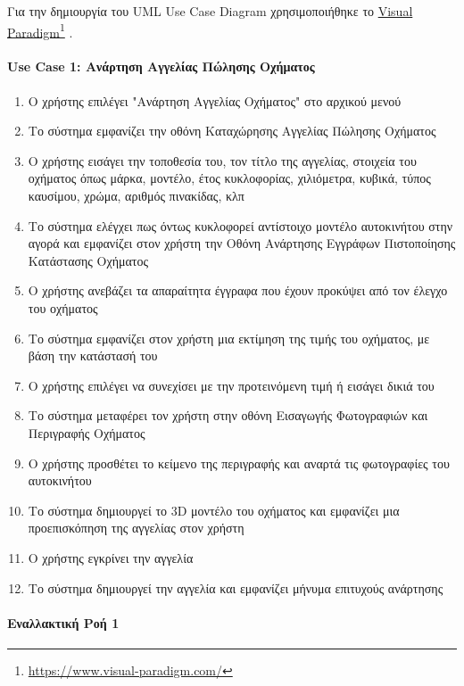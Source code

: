 \documentclass{../ol-softwaremanual}
\newcommand{\doclink}[2]{\href{#1}{#2}\footnote{\url{#1}}}
\begin{document}
	Για την δημιουργία του \en UML Use Case Diagram \gr χρησιμοποιήθηκε το \en \doclink{https://www.visual-paradigm.com/}{Visual Paradigm} . \gr \break 
	
	\newpage
	
	
	\paragraph{\en Use Case 1: \gr Ανάρτηση Αγγελίας Πώλησης Οχήματος}
	
	\begin{enumerate}
		
		\item Ο χρήστης επιλέγει \en"\gr Ανάρτηση Αγγελίας Οχήματος\en" \gr στο αρχικού μενού
		\item Το σύστημα εμφανίζει την οθόνη Καταχώρησης Αγγελίας Πώλησης Οχήματος
		\item Ο χρήστης εισάγει την τοποθεσία του, τον τίτλο της αγγελίας, στοιχεία του οχήματος όπως μάρκα, μοντέλο, έτος κυκλοφορίας, χιλιόμετρα, κυβικά, τύπος καυσίμου, χρώμα, αριθμός πινακίδας, κλπ
		\item Το σύστημα ελέγχει πως όντως κυκλοφορεί αντίστοιχο μοντέλο αυτοκινήτου στην αγορά και εμφανίζει στον χρήστη την Οθόνη Ανάρτησης Εγγράφων Πιστοποίησης Κατάστασης Οχήματος
		\item Ο χρήστης ανεβάζει τα απαραίτητα έγγραφα που έχουν προκύψει από τον έλεγχο του οχήματος		
		\item Το σύστημα εμφανίζει στον χρήστη μια εκτίμηση της τιμής του οχήματος, με βάση την κατάστασή του
		\item Ο χρήστης επιλέγει να συνεχίσει με την προτεινόμενη τιμή ή εισάγει δικιά του
		\item Το σύστημα μεταφέρει τον χρήστη στην οθόνη Εισαγωγής Φωτογραφιών και Περιγραφής Οχήματος
		\item Ο χρήστης προσθέτει το κείμενο της περιγραφής και αναρτά τις φωτογραφίες του αυτοκινήτου
		\item Το σύστημα δημιουργεί το \en 3D \gr μοντέλο του οχήματος και εμφανίζει μια προεπισκόπηση της αγγελίας στον χρήστη
		\item Ο χρήστης εγκρίνει την αγγελία
		\item Το σύστημα δημιουργεί την αγγελία και εμφανίζει μήνυμα επιτυχούς ανάρτησης
	\end{enumerate}
	
	\paragraph{Εναλλακτική Ροή 1}
	
\end{document}
